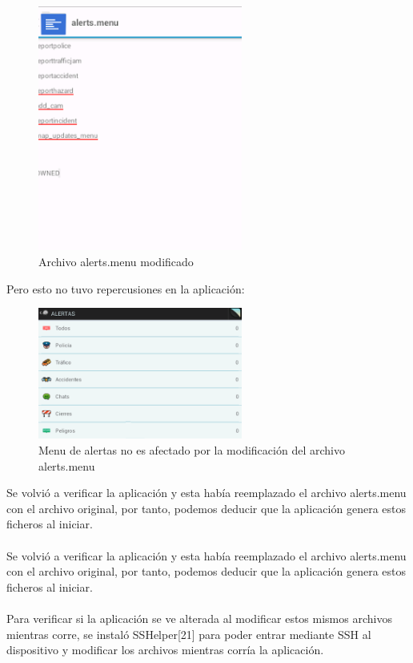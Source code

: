         \begin{figure}[H]
  \begin{center}
    \includegraphics[width=0.6\textwidth]{imagenes/fig41.png}
    \caption{Archivo alerts.menu modificado}
  \end{center}
\end{figure}

Pero esto no tuvo repercusiones en la aplicación:


        \begin{figure}[H]
  \begin{center}
    \includegraphics[width=0.6\textwidth]{imagenes/fig42.png}
    \caption{Menu de alertas no es afectado por la modificación del archivo alerts.menu}
  \end{center}
\end{figure}


Se volvió a verificar la aplicación y esta había reemplazado el archivo alerts.menu con el archivo original, por tanto, podemos deducir que la aplicación genera estos ficheros al iniciar.
\\\\
Se volvió a verificar la aplicación y esta había reemplazado el archivo alerts.menu con el archivo original, por tanto, podemos deducir que la aplicación genera estos ficheros al iniciar.
\\\\
Para verificar si la aplicación se ve alterada al modificar estos mismos archivos mientras corre, se instaló SSHelper[21] para poder entrar mediante SSH al dispositivo y modificar los archivos mientras corría la aplicación.


